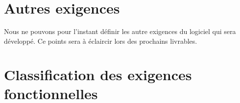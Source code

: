 \section{Autres exigences}

Nous ne pouvons pour l'instant définir les autre exigences du logiciel qui sera développé. Ce points sera à éclaircir lors des prochains livrables.

\section{Classification des exigences fonctionnelles}


